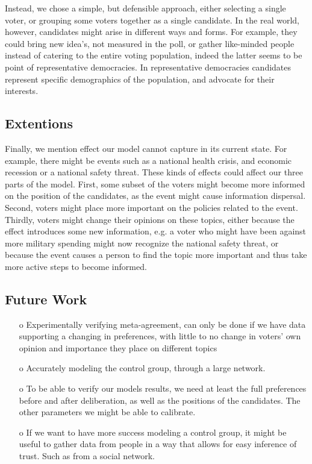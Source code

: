 Instead, we chose a simple, but defensible approach, either selecting a single
voter, or grouping some voters together as a single candidate. In the real
world, however, candidates might arise in different ways and forms. For
example, they could bring new idea's, not measured in the poll, or gather
like-minded people instead of catering to the entire voting population, indeed
the latter seems to be point of representative democracies. In representative
democracies candidates represent specific demographics of the population, and
advocate for their interests.



\subsection{Extentions}

Finally, we mention effect our model cannot capture in its current state. For
example, there might be events such as a national health crisis, and economic
recession or a national safety threat. These kinds of effects could affect our
three parts of the model. First, some subset of the voters might become more
informed on the position of the candidates, as the event might cause
information dispersal. Second, voters might place more important on the
policies related to the event. Thirdly, voters might change their opinions on
these topics, either because the effect introduces some new information, e.g. a
voter who might have been against more military spending might now recognize
the national safety threat, or because the event causes a person to find the
topic more important and thus take more active steps to become informed.

\subsection{Future Work}


\begin{itemize}
	\item [o] Experimentally verifying meta-agreement, can only be done if we have data supporting a changing in preferences, with little to no change in voters' own opinion and importance they place on different topics
	\item [o] Accurately modeling the control group, through a large network.
	\item[o] To be able to verify our models results, we need at least the full preferences before and after deliberation, as well as the positions of the candidates. The other parameters we might be able to calibrate.
	\item[o] If we want to have more success modeling a control group, it might be useful to gather data from people in a way that allows for easy inference of trust. Such as from a social network.
\end{itemize}


